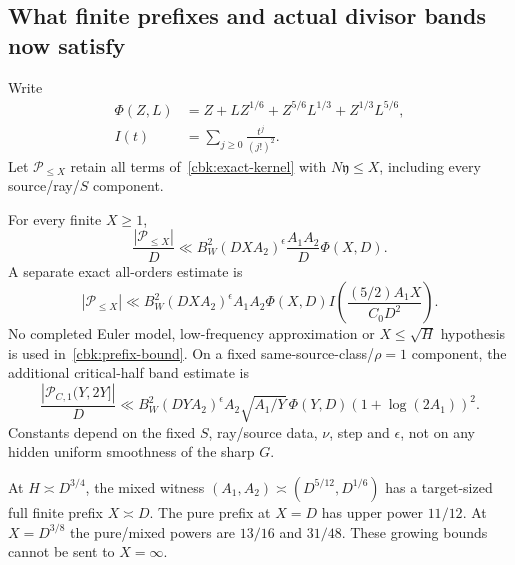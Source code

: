 \subsection{What finite prefixes and actual divisor bands now satisfy}
\label{cbk:comparisons}
Write
\begin{equation}\label{cbk:Phi}
 \begin{aligned}
 \Phi(Z,L)&=Z+LZ^{1/6}+Z^{5/6}L^{1/3}+Z^{1/3}L^{5/6},\\
 I(t)&=\sum_{j\ge0}\frac{t^j}{(j!)^2}.
 \end{aligned}
\end{equation}
Let $\mathcal P_{\le X}$ retain all terms of~\eqref{cbk:exact-kernel}
with $N\mathfrak y\le X$, including every source/ray/$S$ component.

\begin{proposition}
\label{cbk:prefix}
For every finite $X\ge1$,
\begin{equation}\label{cbk:prefix-bound}
 \frac{|\mathcal P_{\le X}|}{D}
   \ll B_W^2(DXA_2)^\epsilon\frac{A_1A_2}{D}\Phi(X,D).
\end{equation}
A separate exact all-orders estimate is
\begin{equation}\label{cbk:all-j}
 |\mathcal P_{\le X}|
  \ll B_W^2(DXA_2)^\epsilon A_1A_2\Phi(X,D)
                 I\left(\frac{(5/2)A_1X}{C_0D^2}\right).
\end{equation}
No completed Euler model, low-frequency approximation or
$X\le\sqrt H$ hypothesis is used in~\eqref{cbk:prefix-bound}.
On a fixed same-source-class/$\rho=1$ component, the additional
critical-half band estimate is
\begin{equation}\label{cbk:half}
 \frac{|\mathcal P_{C,1}(Y,2Y]|}{D}
  \ll B_W^2(DYA_2)^\epsilon A_2\sqrt{A_1/Y}\,
                      \Phi(Y,D)(1+\log(2A_1))^2.
\end{equation}
Constants depend on the fixed $S$, ray/source data, $\nu$, step and
$\epsilon$, not on any hidden uniform smoothness of the sharp $G$.
\end{proposition}
At $H\asymp D^{3/4}$, the mixed witness
$(A_1,A_2)\asymp(D^{5/12},D^{1/6})$ has a target-sized full finite
prefix $X\asymp D$. The pure prefix at $X=D$ has upper power $11/12$.
At $X=D^{3/8}$ the pure/mixed powers are $13/16$ and $31/48$.
These growing bounds cannot be sent to $X=\infty$.

